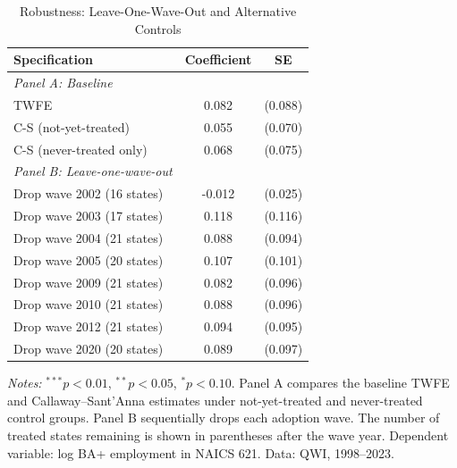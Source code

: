 
\begin{table}[htbp]
\centering
\caption{Robustness: Leave-One-Wave-Out and Alternative Controls}
\label{tab:robust}
\begin{threeparttable}
\begin{tabular}{lcc}
\toprule
Specification & Coefficient & SE \\
\midrule
\textit{Panel A: Baseline} & & \\
TWFE & 0.082 & (0.088) \\
C-S (not-yet-treated) & 0.055 & (0.070) \\
C-S (never-treated only) & 0.068 & (0.075) \\
\addlinespace
\textit{Panel B: Leave-one-wave-out} & & \\
Drop wave 2002 (16 states) & -0.012 & (0.025) \\
Drop wave 2003 (17 states) & 0.118 & (0.116) \\
Drop wave 2004 (21 states) & 0.088 & (0.094) \\
Drop wave 2005 (20 states) & 0.107 & (0.101) \\
Drop wave 2009 (21 states) & 0.082 & (0.096) \\
Drop wave 2010 (21 states) & 0.088 & (0.096) \\
Drop wave 2012 (21 states) & 0.094 & (0.095) \\
Drop wave 2020 (20 states) & 0.089 & (0.097) \\
\bottomrule
\end{tabular}
\begin{tablenotes}[flushleft]
\small
\item \textit{Notes:} $^{***}p<0.01$, $^{**}p<0.05$, $^{*}p<0.10$. Panel A compares the baseline TWFE and Callaway--Sant'Anna estimates under not-yet-treated and never-treated control groups. Panel B sequentially drops each adoption wave. The number of treated states remaining is shown in parentheses after the wave year. Dependent variable: log BA+ employment in NAICS 621. Data: QWI, 1998--2023.
\end{tablenotes}
\end{threeparttable}
\end{table}

